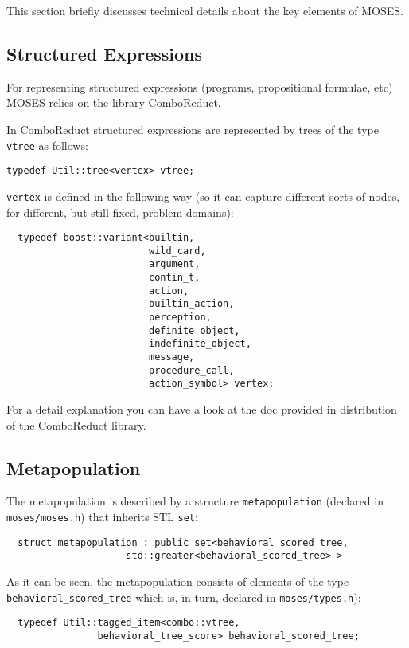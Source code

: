 \documentclass{article}
\begin{document}
This section briefly discusses technical details about the key elements of MOSES.

\subsection{Structured Expressions}

For representing structured expressions (programs, propositional formulae, etc)
MOSES relies on the library ComboReduct.

In ComboReduct structured expressions are represented 
by trees of the type 
\verb|vtree| as follows:

\verb|typedef Util::tree<vertex> vtree;|

\verb|vertex| is defined in the following way
(so it can capture different sorts of nodes, for different, but still
fixed, problem domains):

\begin{verbatim}
  typedef boost::variant<builtin,
                         wild_card,
                         argument,
                         contin_t,
                         action,
                         builtin_action,
                         perception,
                         definite_object,
                         indefinite_object,
                         message,
                         procedure_call,
                         action_symbol> vertex;
\end{verbatim}

For a detail explanation you can have a look at the doc provided in distribution of the ComboReduct library.

\subsection{Metapopulation}

The metapopulation is described by a structure \verb|metapopulation|
(declared in \verb|moses/moses.h|) that inherits STL \verb|set|:

\begin{verbatim}
  struct metapopulation : public set<behavioral_scored_tree,
				     std::greater<behavioral_scored_tree> > 
\end{verbatim}

As it can be seen, the metapopulation consists of elements of the type
\verb|behavioral_scored_tree| which is, in turn, declared in 
\verb|moses/types.h|):

\begin{verbatim}
  typedef Util::tagged_item<combo::vtree,
			    behavioral_tree_score> behavioral_scored_tree;
\end{verbatim}
\end{document}
